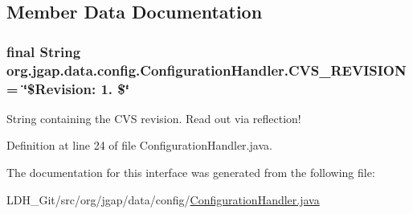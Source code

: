 \subsection{Member Data Documentation}
\hypertarget{interfaceorg_1_1jgap_1_1data_1_1config_1_1_configuration_handler_a36c79d84ace5cb07b47732b1ca361e91}{
\subsubsection[{C\-V\-S\-\_\-\-R\-E\-V\-I\-S\-I\-O\-N}]{\setlength{\rightskip}{0pt plus 5cm}final String org.\-jgap.\-data.\-config.\-Configuration\-Handler.\-C\-V\-S\-\_\-\-R\-E\-V\-I\-S\-I\-O\-N = \char`\"{}\$Revision\-: 1. \$\char`\"{}\hspace{0.3cm}{\ttfamily [static]}}}\label{interfaceorg_1_1jgap_1_1data_1_1config_1_1_configuration_handler_a36c79d84ace5cb07b47732b1ca361e91}
String containing the C\-V\-S revision. Read out via reflection! 

Definition at line 24 of file Configuration\-Handler.\-java.



The documentation for this interface was generated from the following file\-:\begin{DoxyCompactItemize}
\item 
L\-D\-H\-\_\-\-Git/src/org/jgap/data/config/\hyperlink{_configuration_handler_8java}{Configuration\-Handler.\-java}\end{DoxyCompactItemize}
